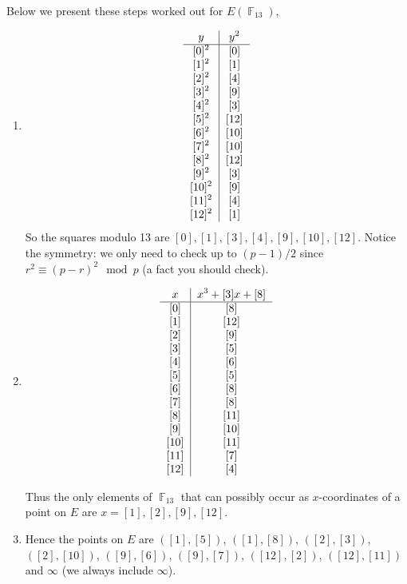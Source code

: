 \documentclass[12 pt]{article}
\DeclareMathOperator{\F}{\mathbb{F}}
\begin{document}
Below we present these steps worked out for $E(\F_{13})$,
\begin{enumerate}
\item \[\text{\begin{tabular}{c|c}
$y$ & $y^2$ \\ \hline
${[}0]^2$ & [0]  \\
${[}1]^2$ & [1]  \\
${[}2]^2$ & [4]  \\
${[}3]^2$ & [9]  \\
${[}4]^2$ & [3]  \\
${[}5]^2$ & [12]  \\
${[}6]^2$ & [10] \\
${[}7]^2$ & [10] \\
${[}8]^2$ & [12]  \\
${[}9]^2$ & [3]  \\
${[}10]^2$ & [9]  \\
${[}11]^2$ & [4]  \\
${[}12]^2$ & [1]  \\
\end{tabular}}\]
So the squares modulo 13 are $[0],[1],[3],[4],[9],[10],[12]$.
Notice the symmetry: we only need to check up to $(p-1)/2$ since $r^2\equiv (p-r)^2 \mod p$ (a fact you should check). \\
\hspace{1mm}
\item \[\text{\begin{tabular}{c|c}
$x$ & $x^3+[3]x+[8]$ \\ \hline
{[}0] & [8] \\
{[}1] & [12] \\
{[}2] & [9] \\
{[}3] & [5] \\
{[}4] & [6] \\
{[}5] & [5] \\
{[}6] & [8] \\
{[}7] & [8] \\
{[}8] & [11] \\
{[}9] & [10] \\
{[}10] & [11] \\
{[}11] & [7] \\
{[}12] & [4] 
\end{tabular}}\]

Thus the only elements of $\F_{13}$ that can possibly occur as $x$-coordinates of a point on $E$ are $x=[1],[2],[9],[12]$.

\item Hence the points on $E$ are $([1],[5])$, $([1],[8])$, $([2],[3])$,  $([2],[10])$, $([9],[6])$, $([9],[7])$, $([12],[2])$, $([12],[11])$ and $\infty$ (we always include $\infty$).


\end{enumerate}
\end{document}
